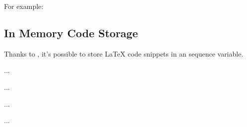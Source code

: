 \documentclass{article}
\begin{document}
For example:
\begin{codestore}
\usepackage[load xtra dialects,
  TeX dialects={doctools,l3kernel,l3ams}]{codedescribe} 
\usepackage[TeX dialects={doctools,my-own-set}]{codedescribe} 
\end{codestore}
%


\subsection{In Memory Code Storage}
Thanks to , it's possible to store \LaTeX{} code snippets in an  sequence variable.


\begin{codestore}
  \begin{codestore}[store-env = store:A]
  ...
  \end{codestore}
  
  \begin{codestore}[st = store:A]
  ...
  \end{codestore}

  \begin{codestore}[storeA]
  ...
  \end{codestore}
  
  \begin{codestore}[store:A]
  ...  
  \end{codestore}
\end{codestore}
\end{document}
